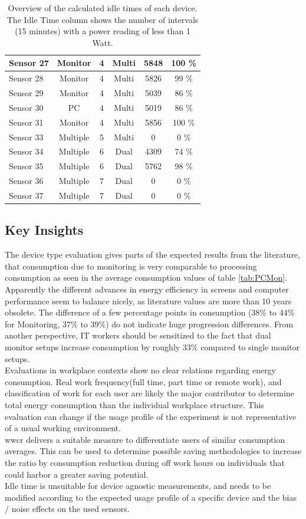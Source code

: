 \begin{table}[ht]
\begin{tabular}{|l|c|c|c|c|c|}
		\hline%
		Sensor 27&Monitor&4&Multi&5848&100 \%\\%
		\hline%
		Sensor 28&Monitor&4&Multi&5826&99 \%\\%
		\hline%
		Sensor 29&Monitor&4&Multi&5039&86 \%\\%
		\hline%
		Sensor 30&PC&4&Multi&5019&86 \%\\%
		\hline%
		Sensor 31&Monitor&4&Multi&5856&100 \%\\%
		\hline%
		Sensor 33&Multiple&5&Multi&0&0 \%\\%
		\hline%
		Sensor 34&Multiple&6&Dual&4309&74 \%\\%
		\hline%
		Sensor 35&Multiple&6&Dual&5762& 98 \%\\%
		\hline%
		Sensor 36&Multiple&7&Dual&0&0 \%\\%
		\hline%
		Sensor 37&Multiple&7&Dual&0&0 \%\\%
		\hline%
	\end{tabular}
	\caption{Overview of the calculated idle times of each device. The Idle Time column shows the number of intervals (15 minutes) with a power reading of less than 1 Watt.}
	\label{tab:idle}
\end{table} 

\subsection{Key Insights}\label{subsec:insights}
\noindent The device type evaluation gives parts of the expected results from the literature\cite{min-energy}, that consumption due to monitoring is very comparable to processing consumption as seen in the average consumption values of table \ref{tab:PCMon}. Apparently the different advances in energy efficiency in screens and computer performance seem to balance nicely, as literature values are more than 10 years obsolete. The difference of a few percentage points in consumption (38\% to 44\% for Monitoring, 37\% to 39\%) do not indicate huge progression differences. From another perspective, IT workers should be sensitized to the fact that dual monitor setups increase consumption by roughly 33\% compared to single monitor setups.\\
Evaluations in workplace contexts show no clear relations regarding energy consumption. Real work frequency(full time, part time or remote work), and classification of work for each user are likely the major contributor to determine total energy consumption than the individual workplace structure. This evaluation can change if the usage profile of the experiment is not representative of a usual working environment.\\
\acrfull{wwcr} delivers a suitable measure to differentiate users of similar consumption averages. This can be used to determine possible saving methodologies to increase the ratio by consumption reduction during off work hours on individuals that could harbor a greater saving potential.\\
Idle time is unsuitable for device agnostic measurements, and needs to be modified according to the expected usage profile of a specific device and the bias / noise effects on the used sensors.

